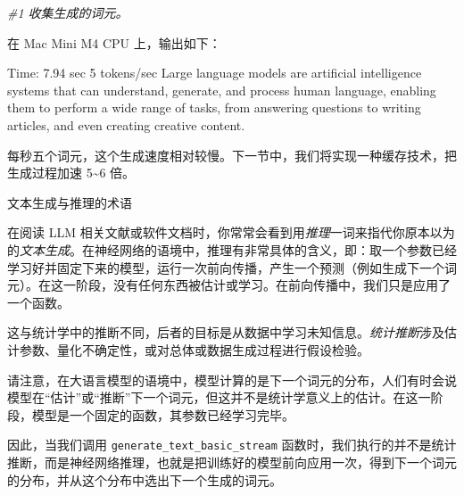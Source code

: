 {\noindent\small\textit{\#1 收集生成的词元。}\par}

在 Mac Mini M4 CPU 上，输出如下：

\begin{codebox}
Time: 7.94 sec
5 tokens/sec
 Large language models are artificial intelligence systems that can
understand, generate, and process human language, enabling them to
perform a wide range of tasks, from answering questions to writing
articles, and even creating creative content.
\end{codebox}

每秒五个词元，这个生成速度相对较慢。下一节中，我们将实现一种缓存技术，把生成过程加速 5\textasciitilde{}6 倍。

\begin{mySidebar}{文本生成与推理的术语}

在阅读 LLM 相关文献或软件文档时，你常常会看到用\emph{推理}一词来指代你原本以为的\emph{文本生成}。在神经网络的语境中，推理有非常具体的含义，即：取一个参数已经学习好并固定下来的模型，运行一次前向传播，产生一个预测（例如生成下一个词元）。在这一阶段，没有任何东西被估计或学习。在前向传播中，我们只是应用了一个函数。

这与统计学中的推断不同，后者的目标是从数据中学习未知信息。\emph{统计推断}涉及估计参数、量化不确定性，或对总体或数据生成过程进行假设检验。

请注意，在大语言模型的语境中，模型计算的是下一个词元的分布，人们有时会说模型在“估计”或“推断”下一个词元，但这并不是统计学意义上的估计。在这一阶段，模型是一个固定的函数，其参数已经学习完毕。

因此，当我们调用 \texttt{generate\_text\_basic\_stream} 函数时，我们执行的并不是统计推断，而是神经网络推理，也就是把训练好的模型前向应用一次，得到下一个词元的分布，并从这个分布中选出下一个生成的词元。

\end{mySidebar}


